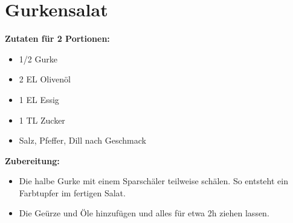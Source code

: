 \section{Gurkensalat}

\textbf{Zutaten für 2 Portionen:}
\begin{itemize}
  \item 1/2 Gurke
  \item 2 EL Olivenöl
  \item 1 EL Essig
  \item 1 TL Zucker
  \item Salz, Pfeffer, Dill nach Geschmack
\end{itemize}

\textbf{Zubereitung:}
\begin{itemize}
  \item Die halbe Gurke mit einem Sparschäler teilweise schälen. So entsteht ein Farbtupfer im fertigen Salat.
  \item Die Geürze und Öle hinzufügen und alles für etwa 2h ziehen lassen.
\end{itemize}
